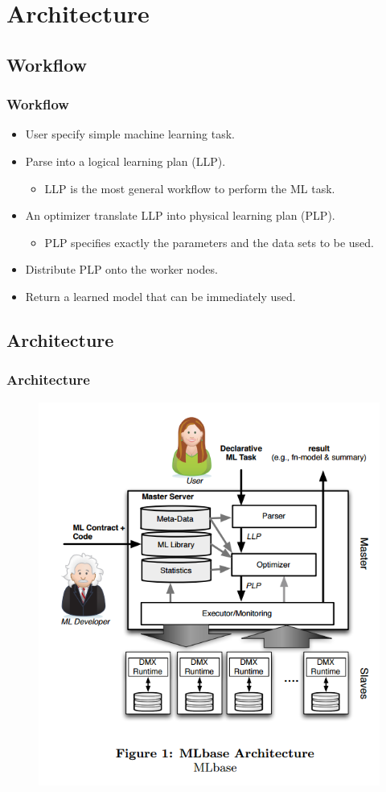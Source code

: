 \section{Architecture}

\subsection{Workflow}
\begin{frame}
    \frametitle{Workflow}
	\begin{itemize}
		\item User specify simple machine learning task.
		\item Parse into a logical learning plan (LLP). 
			\begin{itemize}
				\item LLP is the most general workflow to perform the ML task.  
			\end{itemize}
		\item An optimizer translate LLP into physical learning plan (PLP).
			\begin{itemize}
				\item PLP specifies exactly the parameters and the data sets to be used. 
			\end{itemize}
		\item Distribute PLP onto the worker nodes.
		\item Return a learned model that can be immediately used. 
	\end{itemize} 
\end{frame}

\subsection{Architecture}
\begin{frame}
    \frametitle{Architecture}
    \begin{figure}
		\includegraphics[scale=0.3]{figure/architecture.png}
	\end{figure}
\end{frame}


